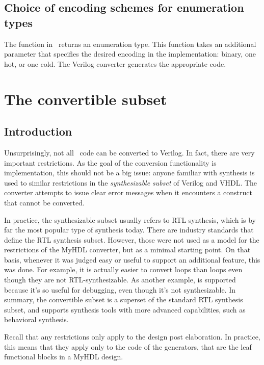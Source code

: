 \subsection{Choice of encoding schemes for enumeration types\label{conv-features-enum}}
The  function in \myhdl\ returns an enumeration type. This
function takes an additional parameter  that specifies the
desired encoding in the implementation: binary, one hot, or one cold.
The Verilog converter generates the appropriate code.


\section{The convertible subset\label{conv-subset}}

\subsection{Introduction\label{conv-subset-intro}}

Unsurprisingly, not all \myhdl\ code can be converted to Verilog. In
fact, there are very important restrictions.  As the goal of the
conversion functionality is implementation, this should not be a big
issue: anyone familiar with synthesis is used to similar restrictions
in the \emph{synthesizable subset} of Verilog and VHDL. The converter
attempts to issue clear error messages when it encounters a construct
that cannot be converted. 

In practice, the synthesizable subset usually refers to RTL synthesis,
which is by far the most popular type of synthesis today. There are
industry standards that define the RTL synthesis subset.  However,
those were not used as a model for the restrictions of the MyHDL
converter, but as a minimal starting point.  On that basis, whenever
it was judged easy or useful to support an additional feature, this
was done. For example, it is actually easier to convert
 loops than  loops even though they are
not RTL-synthesizable.  As another example,  is
supported because it's so useful for debugging, even though it's not
synthesizable.  In summary, the convertible subset is a superset of
the standard RTL synthesis subset, and supports synthesis tools with
more advanced capabilities, such as behavioral synthesis.

Recall that any restrictions only apply to the design post
elaboration.  In practice, this means that they apply only to the code
of the generators, that are the leaf functional blocks in a MyHDL
design.

